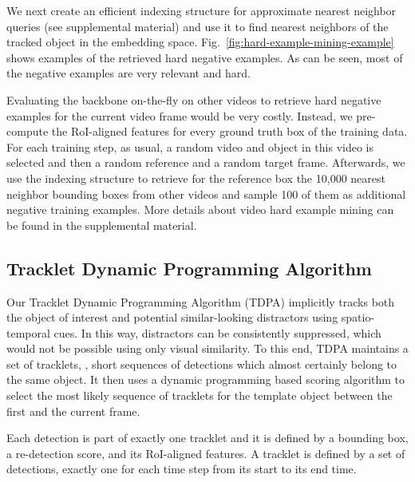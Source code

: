 \documentclass[10pt,twocolumn,letterpaper]{article}
\newcommand{\PAR}[1]{\vskip1pt \noindent {\bf #1~}}
\begin{document}
\PAR{Index Structure.} We next create an efficient indexing structure for approximate nearest neighbor queries (see supplemental material) and use it to find nearest neighbors of the tracked object in the embedding space. Fig.~\ref{fig:hard-example-mining-example} shows examples of the retrieved hard negative examples. As can be seen, most of the negative examples are very relevant and hard.

\PAR{Training Procedure.}
Evaluating the backbone on-the-fly on other videos to retrieve hard negative examples for the current video frame would be very costly. Instead, we pre-compute the RoI-aligned features for every ground truth box of the training data. For each training step, as usual, a random video and object in this video is selected and then a random reference and a random target frame. Afterwards, we use the indexing structure to retrieve for the reference box  the 10,000 nearest neighbor bounding boxes from other videos and sample 100 of them as additional negative training examples. More details about video hard example mining can be found in the supplemental material.

\subsection{Tracklet Dynamic Programming Algorithm}
\label{subsec:trackingalg}
Our Tracklet Dynamic Programming Algorithm (TDPA) implicitly tracks both the object of interest and potential similar-looking distractors using spatio-temporal cues. In this way, distractors can be consistently suppressed, which would not be possible using only visual similarity.
To this end, TDPA maintains a set of tracklets, \ie, short sequences of detections which almost certainly belong to the same object. It then uses a dynamic programming based scoring algorithm to select the most likely sequence of tracklets for the template object between the first and the current frame.

Each detection is part of exactly one tracklet and it is defined by a bounding box, a re-detection score, and its RoI-aligned features. A tracklet is defined by a set of detections, exactly one for each time step from its start to its end time.

\end{document}
